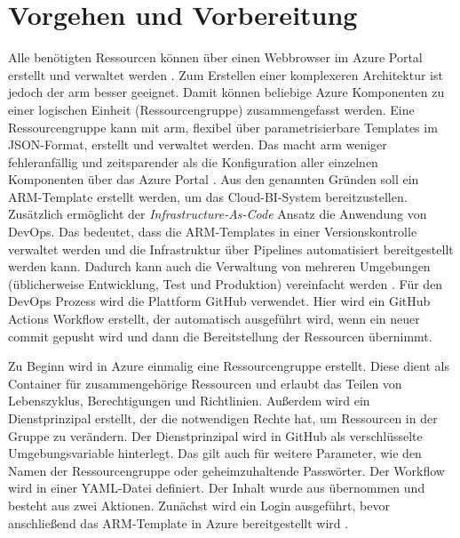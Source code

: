\section{Vorgehen und Vorbereitung} \label{sec:intro:azDevOps}
Alle benötigten Ressourcen können über einen Webbrowser im Azure Portal erstellt und verwaltet werden \cite{chilberto_building_2020}. Zum Erstellen einer komplexeren Architektur ist jedoch der \ac{arm} besser geeignet. Damit können beliebige Azure Komponenten zu einer logischen Einheit (Ressourcengruppe) zusammengefasst werden. Eine Ressourcengruppe kann mit \ac{arm}, flexibel über parametrisierbare Templates im JSON-Format, erstellt und verwaltet werden. Das macht \ac{arm} weniger fehleranfällig und zeitsparender als die Konfiguration aller einzelnen Komponenten über das Azure Portal \cite{monadjemi_azure-administration_2017}. Aus den genannten Gründen soll ein ARM-Template erstellt werden, um das Cloud-BI-System bereitzustellen. Zusätzlich ermöglicht der \textit{Infrastructure-As-Code} Ansatz die Anwendung von DevOps. Das bedeutet, dass die ARM-Templates in einer Versionskontrolle verwaltet werden und die Infrastruktur über Pipelines automatisiert bereitgestellt werden kann. Dadurch kann auch die Verwaltung von mehreren Umgebungen (üblicherweise Entwicklung, Test und Produktion) vereinfacht werden \cite{riscutia_data_2021}. Für den DevOps Prozess wird die Plattform GitHub verwendet. Hier wird ein GitHub Actions Workflow erstellt, der automatisch ausgeführt wird, wenn ein neuer commit gepusht wird und dann die Bereitstellung der Ressourcen übernimmt. 

Zu Beginn wird in Azure einmalig eine Ressourcengruppe erstellt. Diese dient als Container für zusammengehörige Ressourcen und erlaubt das Teilen von Lebenszyklus, Berechtigungen und Richtlinien. Außerdem wird ein Dienstprinzipal erstellt, der die notwendigen Rechte hat, um Ressourcen in der Gruppe zu verändern. Der Dienstprinzipal wird in GitHub als verschlüsselte Umgebungsvariable hinterlegt. Das gilt auch für weitere Parameter, wie den Namen der Ressourcengruppe oder geheimzuhaltende Passwörter. Der Workflow wird in einer YAML-Datei definiert. Der Inhalt wurde aus  übernommen und besteht aus zwei Aktionen. Zunächst wird ein Login ausgeführt, bevor anschließend das ARM-Template in Azure bereitgestellt wird \cite[vgl.][]{rendon_deploy_2022}.